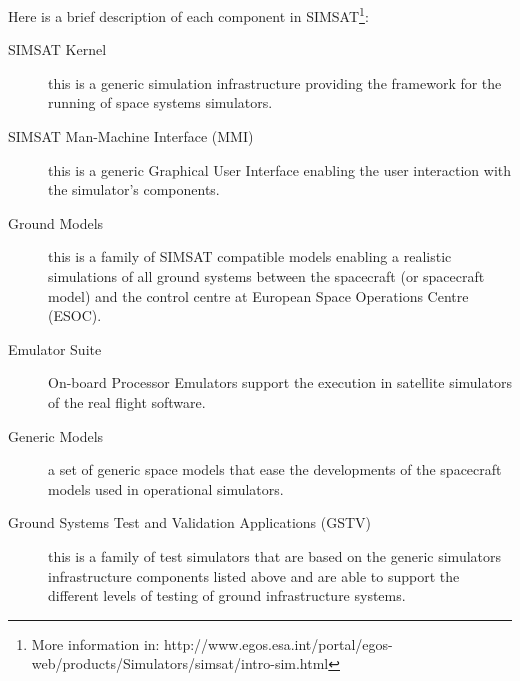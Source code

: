 Here is a brief description of each component in SIMSAT\footnote{More information in: http://www.egos.esa.int/portal/egos-web/products/Simulators/simsat/intro-sim.html}:
\begin{description}
\item[SIMSAT Kernel] this is a generic simulation infrastructure providing the framework for the running of space systems simulators.
\item[SIMSAT Man-Machine Interface (MMI)] this is a generic Graphical User Interface enabling the user interaction with the simulator's components.
\item[Ground Models] this is a family of SIMSAT compatible models enabling a realistic simulations of all ground systems between the spacecraft (or spacecraft model) and the control centre at European Space Operations Centre (ESOC).
\item[Emulator Suite] On-board Processor Emulators support the execution in satellite simulators of the real flight software.
\item[Generic Models] a set of generic space models that ease the developments of the spacecraft models used in operational simulators.
\item[Ground Systems Test and Validation Applications (GSTV)] this is a family of test simulators that are based on the generic simulators infrastructure components listed above and are able to support the different levels of testing of ground infrastructure systems.
\end{description}

